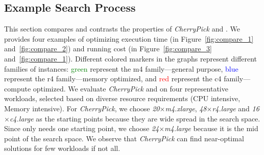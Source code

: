 \subsection{Example Search Process}

This section compares and contrasts the properties of \emph{CherryPick} and \scout.
We provides four examples of optimizing execution time (in Figure~\ref{fig:compare_1} and~\ref{fig:compare_2}) and running cost (in Figure~\ref{fig:compare_3} and~\ref{fig:compare_1}). Different colored markers in the graphs represent different families of instances: \textcolor{green}{green} represent the m4 family---general purpose, \textcolor{blue}{blue} represent the r4 family---memory optimized, and \textcolor{red}{red} represent the c4 family---compute optimized.
We evaluate \emph{CherryPick} and \scout on four representative workloads, selected based on diverse resource requirements (CPU intensive, Memory intensive).
For \emph{CherryPick}, we choose
\emph{20$\times$m4.xlarge}, \emph{48$\times$r4.large} and \emph{16$\times$c4.large} as the starting points because
they are wide spread in the search space.
Since \scout only needs one starting point,
we choose \emph{24$\times$m4.large} because it is the mid point of the search space.
We observe that \emph{CherryPick} can find near-optimal solutions for few workloads if not all.

